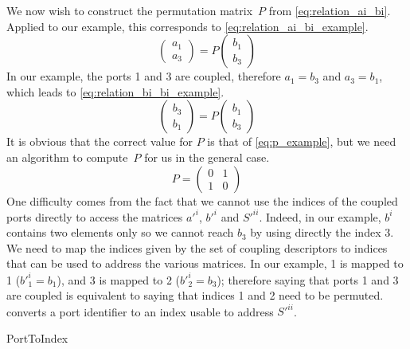 We now wish to construct the permutation matrix~$P$ from \cref{eq:relation_ai_bi}.
Applied to our example, this corresponds to \cref{eq:relation_ai_bi_example}.
\begin{equation}
    \begin{pmatrix}
        a_1 \\ a_3
    \end{pmatrix}
    =
    P
    \begin{pmatrix}
        b_1 \\ b_3
    \end{pmatrix}
    \label{eq:relation_ai_bi_example}
\end{equation}
In our example, the ports 1 and 3 are coupled, therefore $a_1 = b_3$ and $a_3 = b_1$, which leads to \cref{eq:relation_bi_bi_example}.
\begin{equation}
    \begin{pmatrix}
        b_3 \\ b_1
    \end{pmatrix}
    =
    P
    \begin{pmatrix}
        b_1 \\ b_3
    \end{pmatrix}
    \label{eq:relation_bi_bi_example}
\end{equation}
It is obvious that the correct value for $P$ is that of \cref{eq:p_example}, but we need an algorithm to compute~$P$ for us in the general case.
\begin{equation}
    P =
    \begin{pmatrix}
        0 & 1 \\
        1 & 0
    \end{pmatrix}
    \label{eq:p_example}
\end{equation}
One difficulty comes from the fact that we cannot use the indices of the coupled ports directly to access the matrices $a'^i$, $b'^i$ and $S'^{ii}$.
Indeed, in our example, $b^i$ contains two elements only so we cannot reach $b_3$ by using directly the index 3.
We need to map the indices given by the set of coupling descriptors to indices that can be used to address the various matrices.
In our example, 1 is mapped to 1 ($b'^i_1 = b_1$), and 3 is mapped to 2 ($b'^i_2 = b_3$); therefore saying that ports 1 and 3 are coupled is equivalent to saying that indices 1 and 2 need to be permuted.
 converts a port identifier to an index usable to address $S'^{ii}$.
\begin{algorithm}
    \caption{PortToIndex}
    \label{algo:port_to_index}
    \begin{algorithmic}
         
         
        \\ 
        \EndFunction
    \end{algorithmic}
\end{algorithm}

